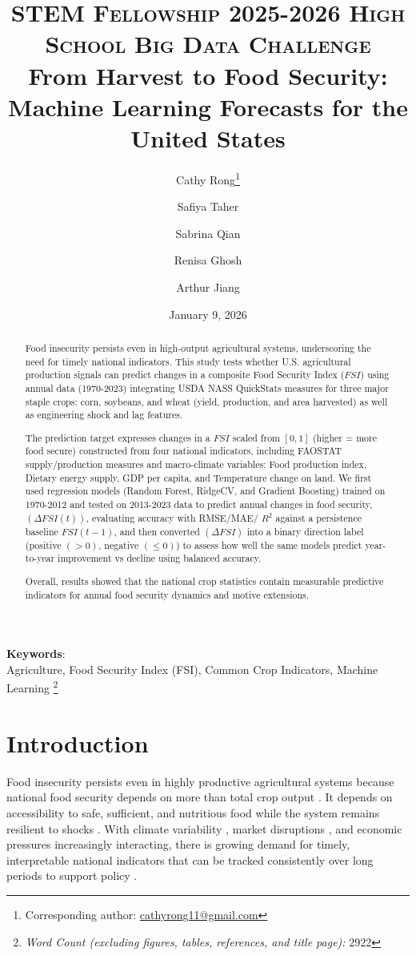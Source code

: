 \documentclass[10pt,twocolumn,letterpaper]{article}
\title{
		\usefont{OT1}{bch}{b}{n}
		\normalfont \normalsize \textsc{STEM Fellowship 2025-2026 High School Big Data Challenge} \\ [10pt]
		\huge From Harvest to Food Security: Machine Learning Forecasts for the United States\\
}
\author[1, 2]{Cathy Rong\thanks{Corresponding author: \href{mailto:cathyrong11@gmail.com}{cathyrong11@gmail.com}}}
\author[1]{Safiya Taher}
\author[1]{Sabrina Qian}
\author[1]{Renisa Ghosh}
\author[1]{Arthur Jiang}
\affil[1]{Old Scona Academic, Edmonton, Alberta, Canada}
\affil[2]{United World Colleges Red Cross Nordic, Flekke, Vestland, Norway}
\date{January 9, 2026}
\newcommand{\WordCountfootnote}{
\begingroup
\renewcommand\thefootnote{}
\footnote{\textit{Word Count (excluding figures, tables, references, and title page):} 2922}
\addtocounter{footnote}{-1}
\endgroup
}
\begin{document}
\maketitle

\begin{abstract}
Food insecurity persists even in high-output agricultural systems, underscoring the need for timely national indicators. This study tests whether U.S. agricultural production signals can predict changes in a composite Food Security Index ($FSI$) using annual data (1970-2023) integrating USDA NASS QuickStats measures for three major staple crops: corn, soybeans, and wheat (yield, production, and area harvested) as well as engineering shock and lag features.

The prediction target expresses changes in a $FSI$ scaled from $[0,1]$ (higher = more food secure) constructed from four national indicators, including FAOSTAT supply/production measures and macro-climate variables: Food production index, Dietary energy supply, GDP per capita, and Temperature change on land. We first used regression models (Random Forest, RidgeCV, and Gradient Boosting) trained on 1970-2012 and tested on 2013-2023 data to predict annual changes in food security, $(\Delta FSI(t))$, evaluating accuracy with RMSE/MAE/ $R^2$ against a persistence baseline $FSI(t-1)$, and then converted $(\Delta FSI)$ into a binary direction label (positive $(>0)$, negative $(\le 0)$) to assess how well the same models predict year-to-year improvement vs decline using balanced accuracy.

Overall, results showed that the national crop statistics contain measurable predictive indicators for annual food security dynamics and motive extensions.

\end{abstract}  
{\textbf{Keywords}: \\ 
Agriculture, Food Security Index (FSI), Common Crop Indicators, Machine Learning}\WordCountfootnote

\section{Introduction}

Food insecurity persists even in highly productive agricultural systems because national food security depends on more than total crop output \cite{Long2020}. It depends on accessibility to safe, sufficient, and nutritious food while the system remains resilient to shocks \cite{Kavallari2014}. With climate variability \cite{Beach2010}, market disruptions \cite{Barnichon2022}, and economic pressures increasingly interacting, there is growing demand for timely, interpretable national indicators that can be tracked consistently over long periods to support policy \cite{Hatfield2011}.
\end{document}
